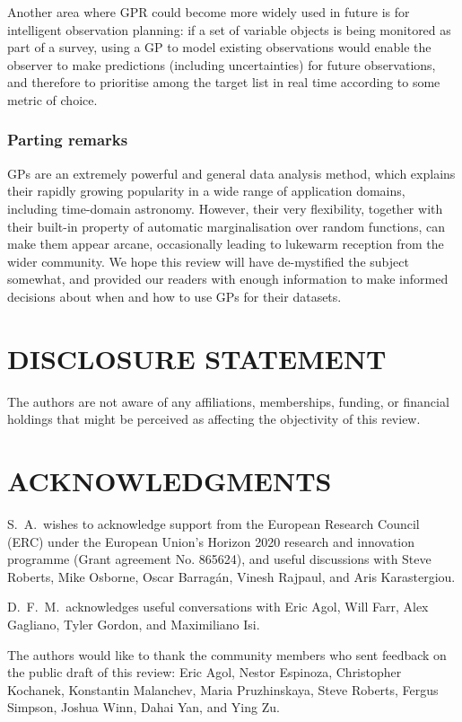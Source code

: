 \documentclass[letterpaper]{ar-1col}
\begin{document}
Another area where GPR could become more widely used in future is for intelligent observation planning: if a set of variable objects is being monitored as part of a survey, using a GP to model existing observations would enable the observer to make predictions (including uncertainties) for future observations, and therefore to prioritise among the target list in real time according to some metric of choice. 

\subsubsection*{Parting remarks} GPs are an extremely powerful and general data analysis method, which explains their rapidly growing popularity in a wide range of application domains, including time-domain astronomy. However, their very flexibility, together with their built-in property of automatic marginalisation over random functions, can make them appear arcane, occasionally leading to lukewarm reception from the wider community. We hope this review will have de-mystified the subject somewhat, and provided our readers with enough information to make informed decisions about when and how to use GPs for their datasets.

\section*{DISCLOSURE STATEMENT}
The authors are not aware of any affiliations, memberships, funding, or financial holdings that
might be perceived as affecting the objectivity of this review.

\section*{ACKNOWLEDGMENTS}
S.\ A.\ wishes to acknowledge support from the European Research Council (ERC) under the 
European Union's Horizon 2020 
research and innovation programme (Grant agreement No. 865624), and useful discussions with Steve Roberts, Mike Osborne, Oscar Barrag{\'a}n, Vinesh Rajpaul, and Aris Karastergiou.

D.\ F.\ M.\ acknowledges useful conversations with
Eric Agol,
Will Farr,
Alex Gagliano,
Tyler Gordon,
and Maximiliano Isi.

The authors would like to thank the community members who sent feedback on the public draft of this review:
Eric Agol,
Nestor Espinoza,
Christopher Kochanek,
Konstantin Malanchev,
Maria Pruzhinskaya,
Steve Roberts,
Fergus Simpson,
Joshua Winn,
Dahai Yan,
and
Ying Zu.
\end{document}
